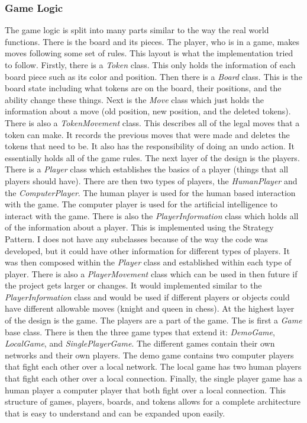 \documentclass{article}
\begin{document}
\subsubsection{Game Logic}
	The game logic is split into many parts similar to the way the real world functions. There is the board and its pieces. The player, who is in a game, makes moves following some set of rules. This layout is what the implementation tried to follow.
	Firstly, there is a \textit{Token} class. This only holds the information of each board piece such as its color and position. Then there is a \textit{Board} class. This is the board state including what tokens are on the board, their positions, and the ability change these things. Next is the \textit{Move} class which just holds the information about a move (old position, new position, and the deleted tokens). There is also a \textit{TokenMovement} class. This describes all of the legal moves that a token can make. It records the previous moves that were made and deletes the tokens that need to be. It also has the responsibility of doing an undo action. It essentially holds all of the game rules. 
	The next layer of the design is the players. There is a \textit{Player} class which establishes the basics of a player (things that all players should have). There are then two types of players, the \textit{HumanPlayer} and the \textit{ComputerPlayer}. The human player is used for the human based interaction with the game. The computer player is used for the artificial intelligence to interact with the game. There is also the \textit{PlayerInformation} class which holds all of the information about a player. This is implemented using the Strategy Pattern. I does not have any subclasses because of the way the code was developed, but it could have other information for different types of players. It was then composed within the \textit{Player} class and established within each type of player. There is also a \textit{PlayerMovement} class which can be used in then future if the project gets larger or changes. It would implemented similar to the \textit{PlayerInformation} class and would be used if different players or objects could have different allowable moves (knight and queen in chess).
	At the highest layer of the design is the game. The players are a part of the game. The is first a \textit{Game} base class. There is then the three game types that extend it: \textit{DemoGame}, \textit{LocalGame}, and \textit{SinglePlayerGame}. The different games contain their own networks and their own players. The demo game contains two computer players that fight each other over a local network. The local game has two human players that fight each other over a local connection. Finally, the single player game has a human player a computer player that both fight over a local connection. This structure of games, players, boards, and tokens allows for a complete architecture that is easy to understand and can be expanded upon easily. 
\end{document}
